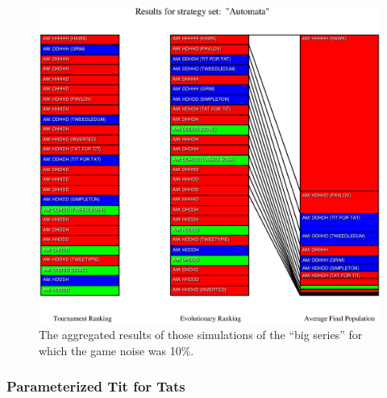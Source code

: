 \begin{figure}
\begin{center}
\includegraphics[width=20cm]{tables/Automata_G0.100.eps}
\caption{\label{Automata_G0100} The aggregated results of those
simulations of the ``big series'' for which the game noise was 10\%.}
\end{center}
\end{figure}

\newpage
\subsubsection{Parameterized Tit for Tats}


